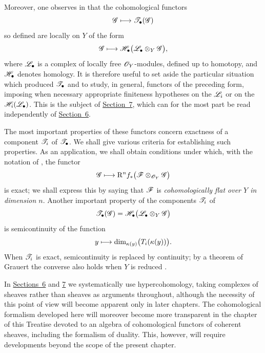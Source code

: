 \begin{env}[6.1.2]
\label{III.6.1.2}
Moreover, one observes in  that the cohomological
functors
\[
  \mathscr{G}\longmapsto\mathscr{T}_\bullet(\mathscr{G})
\]
so defined are locally on $Y$ of the form
\[
  \mathscr{G}\longmapsto
  \mathscr{H}_\bullet\bigl(\mathscr{L}_\bullet\otimes_Y\mathscr{G}\bigr),
\]
where $\mathscr{L}_\bullet$ is a complex of locally free
$\mathscr{O}_Y$-modules, defined up to homotopy, and
$\mathscr{H}_\bullet$ denotes homology.  It is therefore useful to set
aside the particular situation which produced
$\mathscr{T}_\bullet$ and to study, in general,
functors of the preceding form, imposing when necessary appropriate
finiteness hypotheses on the $\mathscr{L}_i$ or on the
$\mathscr{H}_i(\mathscr{L}_\bullet)$.  This is the subject of \hyperref[section:III.7]{Section~7},
which can for the most part be read independently of \hyperref[section:III.6]{Section~6}.

The most important properties of these functors concern exactness
of a component $\mathscr{T}_i$ of $\mathscr{T}_\bullet$.  We shall give
various criteria for establishing such properties.  As an
application, we shall obtain conditions under which, with the
notation of , the functor
\[
  \mathscr{G}\longmapsto
  \mathrm R^n f_*\bigl(\mathscr{F}\otimes_{\mathscr{O}_Y}\mathscr{G}\bigr)
\]
is exact; we shall express this by saying that $\mathscr{F}$ is
\emph{cohomologically flat over $Y$ in dimension $n$}.
Another important property of the components $\mathscr{T}_i$ of
\[
  \mathscr{T}_\bullet(\mathscr{G})
  =
  \mathscr{H}_\bullet\bigl(\mathscr{L}_\bullet\otimes_Y\mathscr{G}\bigr)
\]
is semicontinuity of the function
\[
  y\longmapsto
  \dim_{\kappa(y)}\bigl(T_i(\kappa(y))\bigr).
\]
When $\mathscr{T}_i$ is exact, semicontinuity is replaced by continuity;
by a theorem of Grauert the converse also holds when $Y$ is reduced
.
\end{env}

\begin{env}[6.1.3]
\label{III.6.1.3}
In \hyperref[section:III.6]{Sections~6} and \hyperref[section:III.7]{7} we systematically use hypercohomology, taking
complexes of sheaves rather than sheaves as arguments throughout,
although the necessity of this point of view will become apparent
only in later chapters.  The cohomological formalism developed here
will moreover become more transparent in the chapter of this
Treatise devoted to an algebra of cohomological functors of coherent
sheaves, including the formalism of duality.  This, however, will
require developments beyond the scope of the present chapter.
\end{env}


